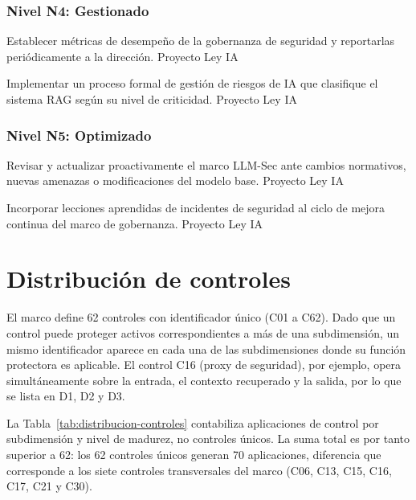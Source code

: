 \subsubsection*{Nivel N4: Gestionado}

  {Establecer métricas de desempeño de la gobernanza de seguridad y reportarlas periódicamente a la dirección.}
  {Proyecto Ley IA}

  {Implementar un proceso formal de gestión de riesgos de IA que clasifique el sistema RAG según su nivel de criticidad.}
  {Proyecto Ley IA}

\subsubsection*{Nivel N5: Optimizado}

  {Revisar y actualizar proactivamente el marco LLM-Sec ante cambios normativos, nuevas amenazas o modificaciones del modelo base.}
  {Proyecto Ley IA}

  {Incorporar lecciones aprendidas de incidentes de seguridad al ciclo de mejora continua del marco de gobernanza.}
  {Proyecto Ley IA}

\section{Distribución de controles}
\label{sec:distribucion}

El marco define 62 controles con identificador único (C01 a C62). Dado que un control puede proteger activos correspondientes a más de una subdimensión, un mismo identificador aparece en cada una de las subdimensiones donde su función protectora es aplicable. El control C16 (proxy de seguridad), por ejemplo, opera simultáneamente sobre la entrada, el contexto recuperado y la salida, por lo que se lista en D1, D2 y D3.

La Tabla~\ref{tab:distribucion-controles} contabiliza aplicaciones de control por subdimensión y nivel de madurez, no controles únicos. La suma total es por tanto superior a 62: los 62 controles únicos generan 70 aplicaciones, diferencia que corresponde a los siete controles transversales del marco (C06, C13, C15, C16, C17, C21 y C30).

